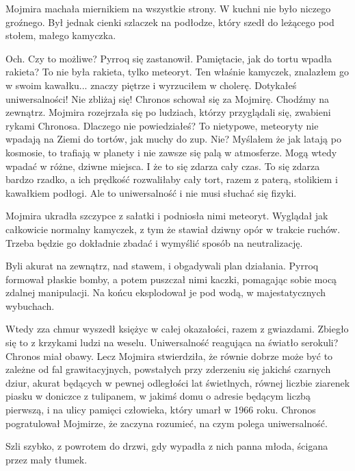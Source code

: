 Mojmira machała miernikiem na wszystkie strony. W kuchni nie było niczego groźnego. Był jednak cienki szlaczek na podłodze, który szedł do leżącego pod stołem, małego kamyczka.

\begin{dialogue}
\ds{} Och. Czy to możliwe? \dm{} Pyrroq się zastanowił. \dm{} Pamiętacie, jak do tortu wpadła rakieta? To nie była rakieta, tylko meteoryt. 
Ten właśnie kamyczek, znalazłem go w swoim kawałku... znaczy piętrze i wyrzuciłem w cholerę.
\ds{} Dotykałeś uniwersalności! Nie zbliżaj się! \dm{} Chronos schował się za Mojmirę.
\ds{} Chodźmy na zewnątrz. \dm{} Mojmira rozejrzała się po ludziach, którzy przyglądali się, zwabieni rykami Chronosa. \dm{} 
Dlaczego nie powiedziałeś? To nietypowe, meteoryty nie wpadają na Ziemi do tortów, jak muchy do zup.
\ds{} Nie? Myślałem że jak latają po kosmosie, to trafiają w planety i nie zawsze się palą w atmosferze. Mogą wtedy wpadać w różne, dziwne miejsca. 
I że to się zdarza cały czas.
\ds{} To się zdarza bardzo rzadko, a ich prędkość rozwaliłaby cały tort, razem z paterą, stolikiem i kawałkiem podłogi. Ale to uniwersalność i nie musi słuchać się fizyki. 
\end{dialogue}

Mojmira ukradła szczypce z sałatki i podniosła nimi meteoryt.
Wyglądał jak całkowicie normalny kamyczek, z tym że stawiał dziwny opór w trakcie ruchów.
Trzeba będzie go dokładnie zbadać i wymyślić sposób na neutralizację.

\divider{}

Byli akurat na zewnątrz, nad stawem, i obgadywali plan działania. 
Pyrroq formował płaskie bomby, a potem puszczał nimi kaczki, pomagając sobie mocą zdalnej manipulacji.
Na końcu eksplodował je pod wodą, w majestatycznych wybuchach.

Wtedy zza chmur wyszedł księżyc w całej okazałości, razem z gwiazdami.
Zbiegło się to z krzykami ludzi na weselu. 
Uniwersalność reagująca na światło serokuli? Chronos miał obawy.
Lecz Mojmira stwierdziła, że równie dobrze może być to zależne od fal grawitacyjnych, powstałych przy zderzeniu się jakichś czarnych dziur, akurat będących 
w pewnej odległości lat świetlnych, równej liczbie ziarenek piasku w doniczce z 
tulipanem, w jakimś domu o adresie będącym liczbą pierwszą, i na ulicy pamięci człowieka, który umarł w 1966 roku.
Chronos pogratulował Mojmirze, że zaczyna rozumieć, na czym polega uniwersalność.

Szli szybko, z powrotem do drzwi, gdy wypadła z nich panna młoda, ścigana przez mały tłumek.

